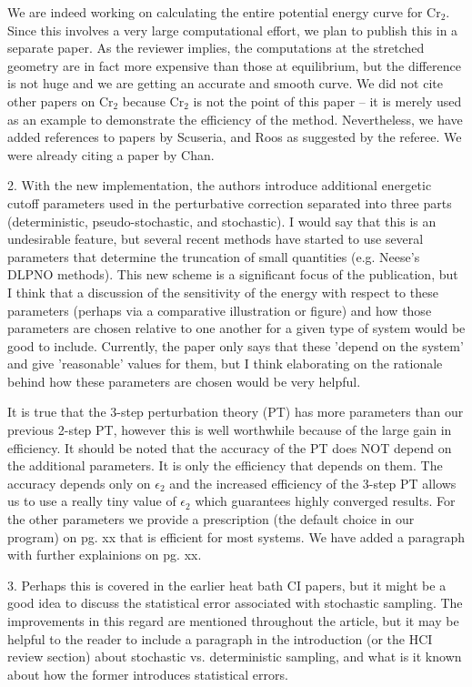 \documentclass[
preprint,
onecolumn,
 superscriptaddress,
 amsmath,amssymb,
 aps,
]{revtex4-1}
\begin{document}
We are indeed working on calculating the entire potential energy curve for Cr$_2$.  Since this
involves a very large computational effort,
we plan to publish this in a separate paper.  As the reviewer implies, the computations at the
stretched geometry are in fact
more expensive than those at equilibrium, but the difference is not huge and we are getting an
accurate and smooth curve.
We did not cite other papers on Cr$_2$ because Cr$_2$ is not the point of this paper -- it is
merely used as an example to demonstrate
the efficiency of the method.  Nevertheless, we have added references to papers by Scuseria,
and Roos as suggested by the referee.  We were already citing a paper by Chan.

\vskip 5mm {\color{blue}
2. With the new implementation, the authors introduce additional energetic cutoff parameters
used in the perturbative correction separated into three parts (deterministic, pseudo-stochastic,
and stochastic). I would say that this is an undesirable feature, but several recent methods have
started to use several parameters that determine the truncation of small quantities (e.g. Neese's
DLPNO methods). This new scheme is a significant focus of the publication, but I think that
a discussion of the sensitivity of the energy with respect to these parameters (perhaps via a
comparative illustration or figure) and how those parameters are chosen relative to one another
for a given type of system would be good to include. Currently, the paper only says that these
'depend on the system' and give 'reasonable' values for them, but I think elaborating on the
rationale behind how these parameters are chosen would be very helpful.
}\color{black}

It is true that the 3-step perturbation theory (PT) has more parameters than our previous 2-step
PT, however this is well worthwhile
because of the large gain in efficiency.  It should be noted that the accuracy of the PT does
NOT depend on the additional parameters.
It is only the efficiency that depends on them.  The accuracy depends only on $\epsilon_2$
and the increased efficiency of the 3-step PT
allows us to use a really tiny value of $\epsilon_2$ which guarantees highly converged results.
For the other parameters we provide a prescription (the default choice in our program) on pg. xx that 
is efficient for most systems.
We have added a paragraph with further explainions on pg. xx.

\vskip 5mm {\color{blue}
3. Perhaps this is covered in the earlier heat bath CI papers, but it might be a good idea to
discuss the statistical error associated with stochastic sampling. The improvements in this
regard are mentioned throughout the article, but it may be helpful to the reader to include a
paragraph in the introduction (or the HCI review section) about stochastic vs. deterministic
sampling, and what is it known about how the former introduces statistical errors.
}\color{black}
\end{document}
